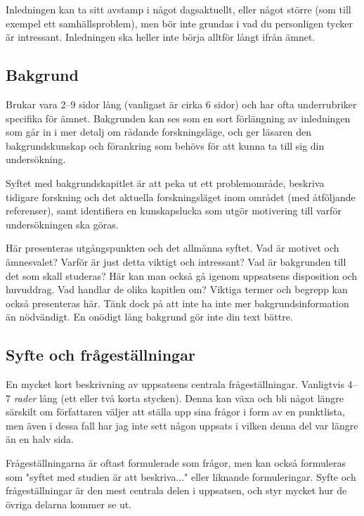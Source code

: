 Inledningen kan ta sitt avstamp i något dagsaktuellt, eller något större (som
till exempel ett samhällsproblem), men bör inte grundas i vad du personligen
tycker är intressant. Inledningen ska heller inte börja alltför långt ifrån
ämnet.


\subsection{Bakgrund}
\label{rubrik.bakgrund}

Brukar vara 2--9 sidor lång (vanligast är cirka 6 sidor) och har ofta
underrubriker specifika för ämnet. Bakgrunden kan ses som en sort förlängning
av inledningen som går in i mer detalj om rådande forskningsläge, och ger
läsaren den bakgrundskunskap och förankring som behövs för att kunna ta till
sig din undersökning.

Syftet med bakgrundskapitlet är att peka ut ett problemområde, beskriva
tidigare forskning och det aktuella forskningsläget inom området (med
åtföljande referenser), samt identifiera en kunskapslucka som utgör motivering
till varför undersökningen ska göras.

Här presenteras utgångspunkten och det allmänna syftet. Vad är motivet och
ämnesvalet? Varför är just detta viktigt och intressant? Vad är bakgrunden till
det som skall studeras? Här kan man också gå igenom uppsatsens disposition och
huvuddrag. Vad handlar de olika kapitlen om? Viktiga termer och begrepp kan
också presenteras här. Tänk dock på att inte ha inte mer bakgrundsinformation
än nödvändigt. En onödigt lång bakgrund gör inte din text bättre.


\subsection{Syfte och frågeställningar}
\label{rubrik.syfte}

En mycket kort beskrivning av uppsatsens centrala frågeställningar. Vanligtvis
4–7 \emph{rader} lång (ett eller två korta stycken). Denna kan växa och bli
något längre särskilt om författaren väljer att ställa upp sina frågor i form
av en punktlista, men även i dessa fall har jag inte sett någon uppsats i
vilken denna del var längre än en halv sida.

Frågeställningarna är oftast formulerade som frågor, men kan också formuleras
som "syftet med studien är att beskriva..." eller liknande formuleringar. Syfte
och frågeställningar är den mest centrala delen i uppsatsen, och styr mycket
hur de övriga delarna kommer se ut.


